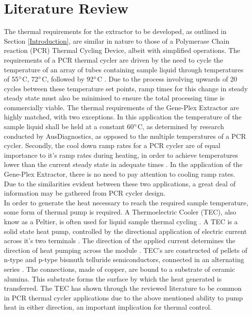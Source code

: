 \chapter{Literature Review}
\label{cha:literaturereview}

The thermal requirements for the extractor to be developed, as outlined in Section \ref{Introduction}, are similar in nature to those of a Polymerase Chain reaction (PCR) Thermal Cycling Device, albeit with simplified operations. The requirements of a PCR thermal cycler are driven by the need to cycle the temperature of an array of tubes containing sample liquid through temperatures of 55$\degree$C, 72$\degree$C, followed by 92$\degree$C \cite{14405884}. Due to the process involving upwards of 20 cycles between these temperature set points, ramp times for this change in steady steady state must also be minimised to ensure the total processing time is commercially viable. The thermal requirements of the Gene-Plex Extractor are highly matched, with two exceptions. In this application the temperature of the sample liquid shall be held at a constant 60$\degree$C, as determined by research conducted by AusDiagnostics, as opposed to the multiple temperatures of a PCR cycler. Secondly, the cool down ramp rates for a PCR cycler are of equal importance to it's ramp rates during heating, in order to achieve temperatures lower than the current steady state in adequate times \cite{2563996}\cite{15156909}. In the application of the Gene-Plex Extractor, there is no need to pay attention to cooling ramp rates. Due to the similarities evident between these two applications, a great deal of information may be gathered from PCR cycler design.\\

In order to generate the heat necessary to reach the required sample temperature, some form of thermal pump is required. A Thermoelectric Cooler (TEC), also know as a Peltier, is often used for liquid sample thermal cycling \cite{12436620}. A TEC is a solid state heat pump, controlled by the directional application of electric current across it's two terminals \cite{20160801988967}. The direction of the applied current determines the direction of heat pumping across the module \cite{20160801988967}. TEC's are constructed of pellets of n-type and p-type bismuth telluride semiconductors, connected in an alternating series \cite{6464884}. The connections, made of copper, are bound to a substrate of ceramic alumina. This substrate forms the surface by which the heat generated is transferred. The TEC has shown through the reviewed literature to be common in PCR thermal cycler applications due to the above mentioned ability to pump heat in either direction, an important implication for thermal control.\\

